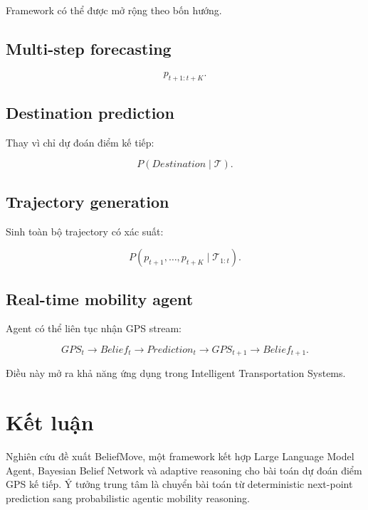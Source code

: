 \documentclass[11pt,a4paper]{article}
\begin{document}
	Framework có thể được mở rộng theo bốn hướng.
	
	\subsection{Multi-step forecasting}
	
	\begin{equation}
		p_{t+1:t+K}.
	\end{equation}
	
	\subsection{Destination prediction}
	
	Thay vì chỉ dự đoán điểm kế tiếp:
	
	\begin{equation}
		P(Destination\mid\mathcal{T}).
	\end{equation}
	
	\subsection{Trajectory generation}
	
	Sinh toàn bộ trajectory có xác suất:
	
	\begin{equation}
		P(
		p_{t+1},\ldots,p_{t+K}
		\mid
		\mathcal{T}_{1:t}
		).
	\end{equation}
	
	\subsection{Real-time mobility agent}
	
	Agent có thể liên tục nhận GPS stream:
	
	\begin{equation}
		GPS_t
		\rightarrow
		Belief_t
		\rightarrow
		Prediction_t
		\rightarrow
		GPS_{t+1}
		\rightarrow
		Belief_{t+1}.
	\end{equation}
	
	Điều này mở ra khả năng ứng dụng trong Intelligent Transportation Systems.
	
	\section{Kết luận}
	
	Nghiên cứu đề xuất BeliefMove, một framework kết hợp Large Language
	Model Agent, Bayesian Belief Network và adaptive reasoning cho bài toán
	dự đoán điểm GPS kế tiếp. Ý tưởng trung tâm là chuyển bài toán từ
	deterministic next-point prediction sang probabilistic agentic mobility
	reasoning.
	
\end{document}
